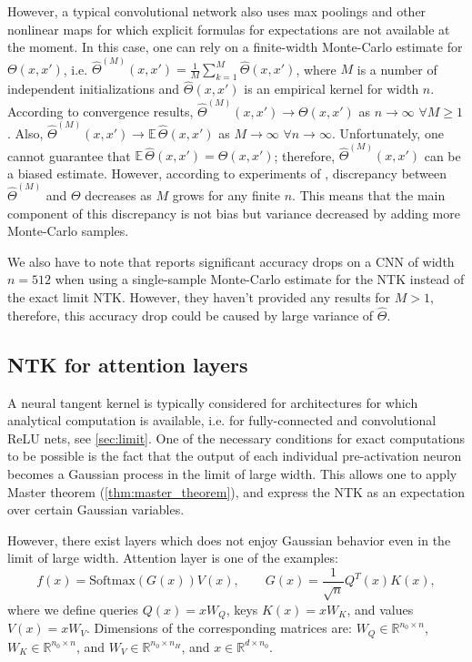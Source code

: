 \documentclass{article}
\newcommand{\EE}{\mathbb{E}\,}
\newcommand{\RR}{\mathbb{R}}
\begin{document}
    However, a typical convolutional network also uses max poolings and other nonlinear maps for which explicit formulas for expectations are not available at the moment.
    In this case, one can rely on a finite-width Monte-Carlo estimate for $\Theta(x,x')$, i.e. $\hat\Theta^{(M)}(x,x') = \frac{1}{M} \sum_{k=1}^M \hat\Theta(x,x')$, where $M$ is a number of independent initializations and $\hat\Theta(x,x')$ is an empirical kernel for width $n$.
    According to convergence results, $\hat\Theta^{(M)}(x,x') \to \Theta(x,x')$ as $n \to \infty$ $\forall M \geq 1$.
    Also, $\hat\Theta^{(M)}(x,x') \to \EE \hat\Theta(x,x')$ as $M \to \infty$ $\forall n \to \infty$.
    Unfortunately, one cannot guarantee that $\EE \hat\Theta(x,x') = \Theta(x,x')$; therefore, $\hat\Theta^{(M)}(x,x')$ can be a biased estimate.
    However, according to experiments of \cite{novak2019neural}, discrepancy between $\hat\Theta^{(M)}$ and $\Theta$ decreases as $M$ grows for any finite $n$.
    This means that the main component of this discrepancy is not bias but variance decreased by adding more Monte-Carlo samples.

    We also have to note that \cite{arora2019exact} reports significant accuracy drops on a CNN of width $n=512$ when using a single-sample Monte-Carlo estimate for the NTK instead of the exact limit NTK.
    However, they haven't provided any results for $M > 1$, therefore, this accuracy drop could be caused by large variance of $\hat\Theta$.


    \subsection{NTK for attention layers}

    A neural tangent kernel is typically considered for architectures for which analytical computation is available, i.e. for fully-connected and convolutional ReLU nets, see \cref{sec:limit}.
    One of the necessary conditions for exact computations to be possible is the fact that the output of each individual pre-activation neuron becomes a Gaussian process in the limit of large width.
    This allows one to apply Master theorem (\cref{thm:master_theorem}), and express the NTK as an expectation over certain Gaussian variables.

    However, there exist layers which does not enjoy Gaussian behavior even in the limit of large width.
    Attention layer is one of the examples:
    \begin{equation}
        f(x)
        = \mathrm{Softmax}\left(G(x)\right) V(x),
        \qquad
        G(x)
        = \frac{1}{\sqrt{n}} Q^T(x) K(x),
    \end{equation}
    where we define queries $Q(x) = x W_Q$, keys $K(x) = x W_K$, and values $V(x) = x W_V$.
    Dimensions of the corresponding matrices are: $W_Q \in \RR^{n_0 \times n}$, $W_K \in \RR^{n_0 \times n}$, and $W_V \in \RR^{n_0 \times n_H}$, and $x \in \RR^{d \times n_0}$.
\end{document}
